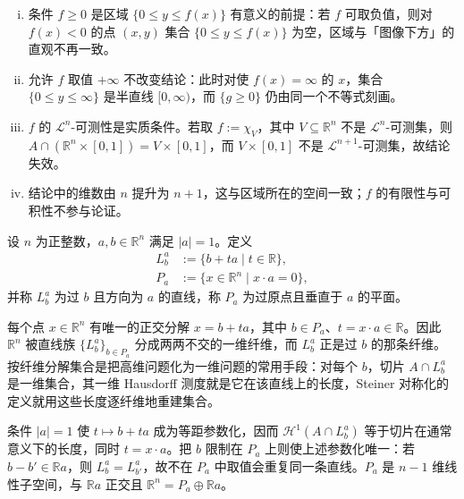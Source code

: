 \documentclass[../../main.tex]{subfiles}%
\begin{document}
\begin{remark}\label{remark:ch02-lem-2-3-条件}
\begin{enumerate}[(i)]
\item 条件 $f\geqslant0$ 是区域 $\{0\leqslant y\leqslant f(x)\}$ 有意义的前提：若 $f$ 可取负值，则对 $f(x)<0$ 的点 $(x,y)$ 集合 $\{0\leqslant y\leqslant f(x)\}$ 为空，区域与「图像下方」的直观不再一致。
\item 允许 $f$ 取值 $+\infty$ 不改变结论：此时对使 $f(x)=\infty$ 的 $x$，集合 $\{0\leqslant y\leqslant\infty\}$ 是半直线 $[0,\infty)$，而 $\{g\geqslant0\}$ 仍由同一个不等式刻画。
\item $f$ 的 $\mathcal{L}^n$-可测性是实质条件。若取 $f:=\chi_V$，其中 $V\subseteq\mathbb{R}^n$ 不是 $\mathcal{L}^n$-可测集，则 $A\cap(\mathbb{R}^n\times[0,1])=V\times[0,1]$，而 $V\times[0,1]$ 不是 $\mathcal{L}^{n+1}$-可测集，故结论失效。
\item 结论中的维数由 $n$ 提升为 $n+1$，这与区域所在的空间一致；$f$ 的有限性与可积性不参与论证。
\end{enumerate}
\end{remark}

\begin{definition*}[直线与平面]\label{definition:ch02-2-3-记号}
设 $n$ 为正整数，$a,b\in\mathbb{R}^n$ 满足 $|a|=1$。定义
\begin{align*}
L_b^a&:=\{b+ta\mid t\in\mathbb{R}\},\\
P_a&:=\{x\in\mathbb{R}^n\mid x\cdot a=0\},
\end{align*}
并称 $L_b^a$ 为过 $b$ 且方向为 $a$ 的直线，称 $P_a$ 为过原点且垂直于 $a$ 的平面。
\end{definition*}

\begin{remark}\label{remark:ch02-def-2-3-记号-条件}
每个点 $x\in\mathbb{R}^n$ 有唯一的正交分解 $x=b+ta$，其中 $b\in P_a$、$t=x\cdot a\in\mathbb{R}$。因此 $\mathbb{R}^n$ 被直线族 $\{L_b^a\}_{b\in P_a}$ 分成两两不交的一维纤维，而 $L_b^a$ 正是过 $b$ 的那条纤维。按纤维分解集合是把高维问题化为一维问题的常用手段：对每个 $b$，切片 $A\cap L_b^a$ 是一维集合，其一维 Hausdorff 测度就是它在该直线上的长度，Steiner 对称化的定义就用这些长度逐纤维地重建集合。

条件 $|a|=1$ 使 $t\mapsto b+ta$ 成为等距参数化，因而 $\mathcal{H}^1(A\cap L_b^a)$ 等于切片在通常意义下的长度，同时 $t=x\cdot a$。把 $b$ 限制在 $P_a$ 上则使上述参数化唯一：若 $b-b'\in\mathbb{R}a$，则 $L_b^a=L_{b'}^a$，故不在 $P_a$ 中取值会重复同一条直线。$P_a$ 是 $n-1$ 维线性子空间，与 $\mathbb{R}a$ 正交且 $\mathbb{R}^n=P_a\oplus\mathbb{R}a$。
\end{remark}
\end{document}
